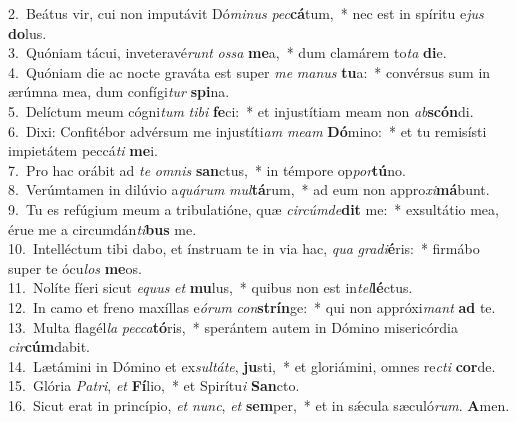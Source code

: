 {2.~}Beátus vir, cui non imputávit Dó\textit{mi}\textit{nus} \textit{pec}\textbf{cá}tum,~* nec est in spíritu e\textit{jus} \textbf{do}lus.\\
{3.~}Quóniam tácui, inveteravé\textit{runt} \textit{os}\textit{sa} \textbf{me}a,~* dum clamárem to\textit{ta} \textbf{di}e.\\
{4.~}Quóniam die ac nocte graváta est super \textit{me} \textit{ma}\textit{nus} \textbf{tu}a:~* convérsus sum in ærúmna mea, dum confígi\textit{tur} \textbf{spi}na.\\
{5.~}Delíctum meum cógni\textit{tum} \textit{ti}\textit{bi} \textbf{fe}ci:~* et injustítiam meam non \textit{ab}\textbf{scón}di.\\
{6.~}Dixi: Confitébor advérsum me injustíti\textit{am} \textit{me}\textit{am} \textbf{Dó}mino:~* et tu remisísti impietátem peccá\textit{ti} \textbf{me}i.\\
{7.~}Pro hac orábit ad \textit{te} \textit{om}\textit{nis} \textbf{san}ctus,~* in témpore op\textit{por}\textbf{tú}no.\\
{8.~}Verúmtamen in dilúvio a\textit{quá}\textit{rum} \textit{mul}\textbf{tá}rum,~* ad eum non appro\textit{xi}\textbf{má}bunt.\\
{9.~}Tu es refúgium meum a tribulatióne, quæ \textit{cir}\textit{cúm}\textit{de}\textbf{dit} me:~* exsultátio mea, érue me a circumdán\textit{ti}\textbf{bus} me.\\
{10.~}Intelléctum tibi dabo, et ínstruam te in via hac, \textit{qua} \textit{gra}\textit{di}\textbf{é}ris:~* firmábo super te ócu\textit{los} \textbf{me}os.\\
{11.~}Nolíte fíeri sicut \textit{e}\textit{quus} \textit{et} \textbf{mu}lus,~* quibus non est in\textit{tel}\textbf{lé}ctus.\\
{12.~}In camo et freno maxíllas e\textit{ó}\textit{rum} \textit{con}\textbf{strín}ge:~* qui non appróxi\textit{mant} \textbf{ad} te.\\
{13.~}Multa flagél\textit{la} \textit{pec}\textit{ca}\textbf{tó}ris,~* sperántem autem in Dómino misericórdia \textit{cir}\textbf{cúm}dabit.\\
{14.~}Lætámini in Dómino et ex\textit{sul}\textit{tá}\textit{te}, \textbf{ju}sti,~* et gloriámini, omnes re\textit{cti} \textbf{cor}de.\\
{15.~}Glória \textit{Pa}\textit{tri}, \textit{et} \textbf{Fí}lio,~* et Spirítu\textit{i} \textbf{San}cto.\\
{16.~}Sicut erat in princípio, \textit{et} \textit{nunc}, \textit{et} \textbf{sem}per,~* et in sǽcula sæculó\textit{rum}. \textbf{A}men.\\
